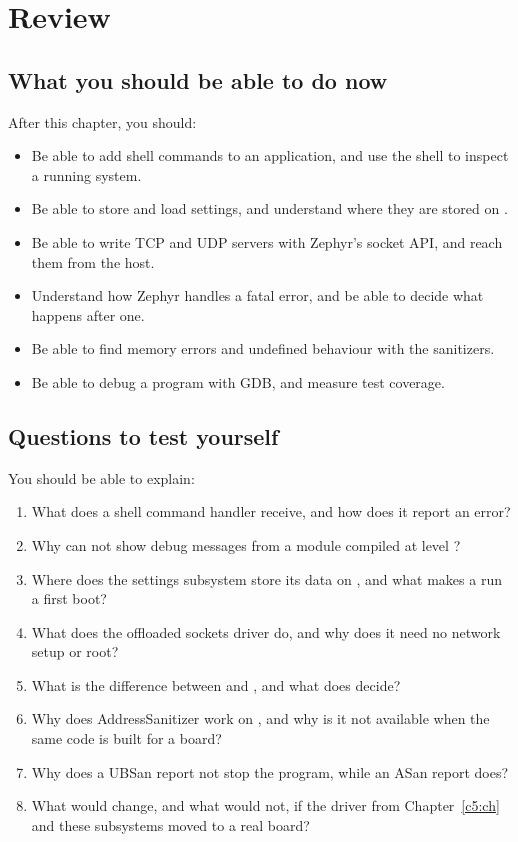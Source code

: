 
\section{Review}
\label{c6:sec:review}

\subsection*{What you should be able to do now}
After this chapter, you should:

\begin{itemize}
  \item Be able to add shell commands to an application, and use the shell to inspect a running system.
  \item Be able to store and load settings, and understand where they are stored on .
  \item Be able to write TCP and UDP servers with Zephyr’s socket API, and reach them from the host.
  \item Understand how Zephyr handles a fatal error, and be able to decide what happens after one.
  \item Be able to find memory errors and undefined behaviour with the sanitizers.
  \item Be able to debug a  program with GDB, and measure test coverage.
\end{itemize}

\subsection*{Questions to test yourself}
You should be able to explain:

\begin{enumerate}
  \item What does a shell command handler receive, and how does it report an error?
  \item Why can  not show debug messages from a module compiled at level ?
  \item Where does the settings subsystem store its data on , and what makes a run a first
    boot?
  \item What does the offloaded sockets driver do, and why does it need no network setup or root?
  \item What is the difference between  and , and what does
     decide?
  \item Why does AddressSanitizer work on , and why is it not available when the same code
    is built for a board?
  \item Why does a UBSan report not stop the program, while an ASan report does?
  \item What would change, and what would not, if the driver from Chapter~\ref{c5:ch} and these subsystems
    moved to a real board?
\end{enumerate}

